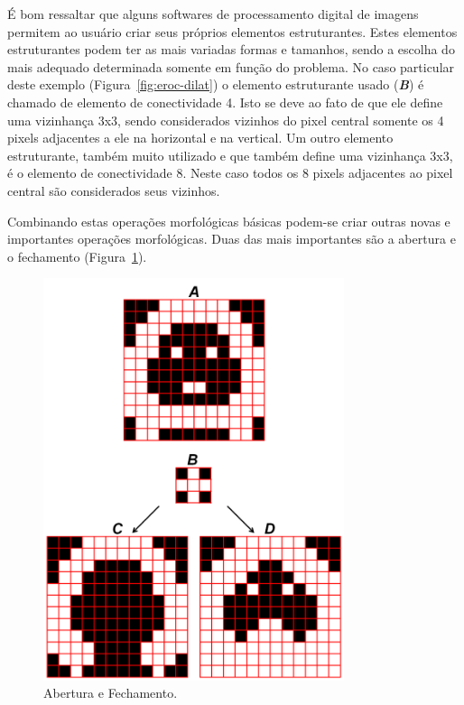 É bom ressaltar que alguns softwares de processamento digital de
imagens permitem ao usuário criar seus próprios elementos
estruturantes.\cite{112} Estes elementos estruturantes podem ter as
mais variadas formas e tamanhos, sendo a escolha do mais adequado
determinada somente em função do problema. No caso particular deste
exemplo (Figura~\ref{fig:eroc-dilat}) o elemento estruturante usado
(\textit{\textbf{B}}) é chamado de elemento de conectividade 4. Isto
se deve ao fato de que ele define uma vizinhança 3x3, sendo
considerados vizinhos do pixel central somente os 4 pixels adjacentes
a ele na horizontal e na vertical. Um outro elemento estruturante,
também muito utilizado e que também define uma vizinhança 3x3, é o
elemento de conectividade 8. Neste caso todos os 8 pixels adjacentes
ao pixel central são considerados seus vizinhos.

Combinando estas operações morfológicas básicas podem-se criar outras
novas e importantes operações morfológicas. Duas das mais importantes
são a abertura e o fechamento (Figura~\ref{fig:open-close}).

\begin{figure} [h]
  \begin{center}
    \includegraphics[height=334pt,width=250pt]{images/fig_open-close}
    \caption{Abertura e Fechamento.}\label{fig:open-close}
  \end{center}
\end{figure}

